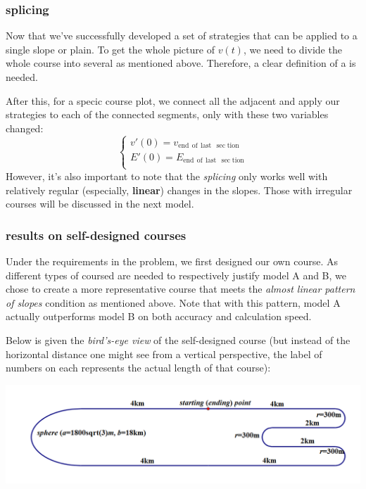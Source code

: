 \documentclass{article}
\begin{document}
		\subsubsection{splicing}
			Now that we've successfully developed a set of strategies that can be applied to a single slope or plain. To get the whole picture of \(v(t)\), we need to divide the whole course into several  as mentioned above. Therefore, a clear definition of a  is needed.

			After this, for a specic course plot, we connect all the adjacent  and apply our strategies to each of the connected segments, only with these two variables changed:
			$$
			\left\{ \begin{array}{c}
				v\prime\left( 0 \right) =v_{\mathrm{end}\:\:\mathrm{of}\:\:\mathrm{last}\:\:\sec\mathrm{tion}}\\
				E\prime\left( 0 \right) =E_{\mathrm{end}\:\:\mathrm{of}\:\:\mathrm{last}\:\:\sec\mathrm{tion}}\\
			\end{array} \right.
			$$
			However, it's also important to note that the \textit{splicing} only works well with relatively regular (especially, \textbf{linear}) changes in the slopes. Those with irregular courses will be discussed in the next model.
		\subsubsection{results on self-designed courses}
			Under the requirements in the problem, we first designed our own course. As different types of coursed are needed to respectively justify model A and B, we chose to create a more representative course that meets the \textit{almost linear pattern of slopes} condition as mentioned above. Note that with this pattern, model A actually outperforms model B on both accuracy and calculation speed.

			Below is given the \textit{bird's-eye view} of the self-designed course (but instead of the horizontal distance one might see from a vertical perspective, the label of numbers on each  represents the actual length of that course):

			\begin{center}
				\includegraphics*[width=15cm]{8.png}
			\end{center}
\end{document}
